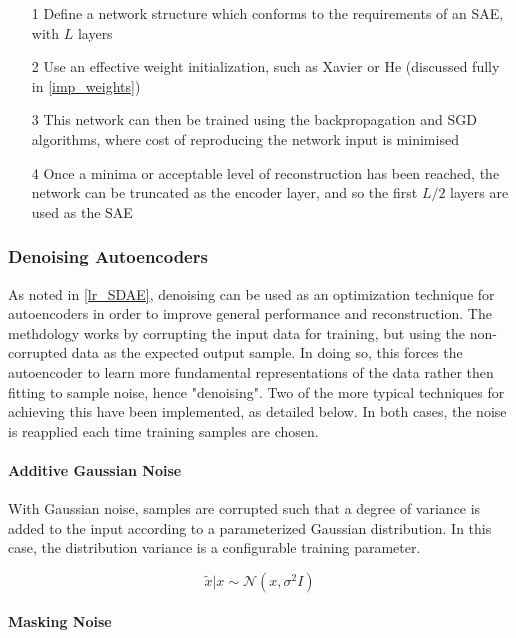 \documentclass[a4paper,11pt,oneside]{article}
\theoremstyle{plain}
\theoremstyle{definition}
\begin{document}
\begin{itemize}
	\item [1] Define a network structure which conforms to the requirements of an SAE, with $L$ layers
	\item [2] Use an effective weight initialization, such as Xavier or He (discussed fully in \ref{imp_weights})
	\item [3] This network can then be trained using the backpropagation and SGD algorithms, where cost of reproducing the network input is minimised
	\item [4] Once a minima or acceptable level of reconstruction has been reached, the network can be truncated as the encoder layer, and so the first $L/2$ layers are used as the SAE
\end{itemize}

\subsubsection{Denoising Autoencoders}

As noted in \ref{lr_SDAE}, denoising can be used as an optimization technique for autoencoders in order to improve general performance and reconstruction. The methdology works by corrupting the input data for training, but using the non-corrupted data as the expected output sample. In doing so, this forces the autoencoder to learn more fundamental representations of the data rather then fitting to sample noise, hence "denoising". Two of the more typical techniques for achieving this have been implemented, as detailed below. In both cases, the noise is reapplied each time training samples are chosen.

\paragraph{Additive Gaussian Noise}

With Gaussian noise, samples are corrupted such that a degree of variance is added to the input according to a parameterized Gaussian distribution. In this case, the distribution variance is a configurable training parameter.

\begin{equation}
\tilde{{x}} | {x} \sim \mathcal{N}\left({x}, \sigma^{2} I\right)
\end{equation}

\paragraph{Masking Noise}
\end{document}
